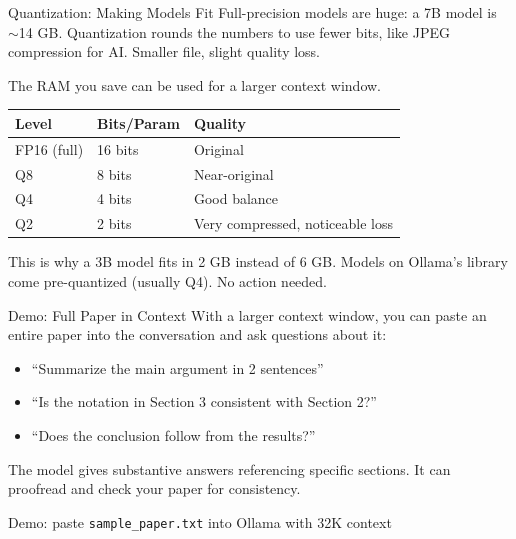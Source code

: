 \documentclass[aspectratio=169]{beamer}
\begin{document}
\begin{frame}{Quantization: Making Models Fit}
    Full-precision models are huge: a 7B model is $\sim$14 GB. Quantization rounds the numbers to use fewer bits, like JPEG compression for AI. Smaller file, slight quality loss.

    \vspace{0.5em}
    The RAM you save can be used for a larger context window.

    \vspace{0.5em}
    \begin{table}
        \centering
        \begin{tabular}{lll}
            \toprule
            \textbf{Level} & \textbf{Bits/Param} & \textbf{Quality} \\
            \midrule
            FP16 (full)  & 16 bits & Original \\
            Q8            & 8 bits  & Near-original \\
            Q4            & 4 bits  & Good balance \\
            Q2            & 2 bits  & Very compressed, noticeable loss \\
            \bottomrule
        \end{tabular}
    \end{table}

    \vspace{0.3em}
    This is why a 3B model fits in 2 GB instead of 6 GB. Models on Ollama's library come pre-quantized (usually Q4). No action needed.
\end{frame}

\begin{frame}{Demo: Full Paper in Context}
    With a larger context window, you can paste an entire paper into the conversation and ask questions about it:

    \begin{itemize}
        \vspace{0.3em}
        \item ``Summarize the main argument in 2 sentences''
        \vspace{0.3em}
        \item ``Is the notation in Section 3 consistent with Section 2?''
        \vspace{0.3em}
        \item ``Does the conclusion follow from the results?''
    \end{itemize}

    \vspace{0.8em}
    The model gives substantive answers referencing specific sections. It can proofread and check your paper for consistency.

    \vspace{0.5em}
    \begin{tcolorbox}[colback=gray!10, colframe=gray!40, boxrule=0.5pt, arc=2pt, fontupper=\small]
        Demo: paste \texttt{sample\_paper.txt} into Ollama with 32K context
    \end{tcolorbox}
\end{frame}
\end{document}

